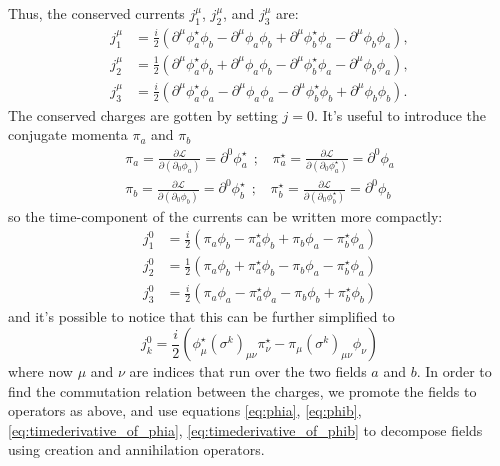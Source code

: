 Thus, the conserved currents \( j^\mu_1 \), \( j^\mu_2 \), and \( j^\mu_3 \)  are:
\[
\begin{aligned}
j^\mu_1 &= \frac{i}{2} \left( \partial^\mu \phi_a^\star \phi_b - \partial^\mu \phi_a \phi_b + \partial^\mu \phi_b^\star \phi_a - \partial^\mu \phi_b \phi_a \right), \\
j^\mu_2 &= \frac{1}{2} \left( \partial^\mu \phi_a^\star \phi_b + \partial^\mu \phi_a \phi_b - \partial^\mu \phi_b^\star \phi_a - \partial^\mu \phi_b \phi_a \right), \\
j^\mu_3 &= \frac{i}{2} \left( \partial^\mu \phi_a^\star \phi_a - \partial^\mu \phi_a \phi_a - \partial^\mu \phi_b^\star \phi_b + \partial^\mu \phi_b \phi_b \right).
\end{aligned}
\]
The conserved charges are gotten by setting $j=0$. It's useful to introduce the conjugate momenta $\pi_a$ and $\pi_b$
\begin{align*} \pi_a = \frac{\partial \mathcal L}{\partial(\partial_0 \phi_a)}= \partial^0 \phi_a^\star~~;~~~~
    \pi_a^\star = \frac{\partial \mathcal L}{\partial(\partial_0 \phi_a^\star)}= \partial^0 \phi_a  \\
       \pi_b =  \frac{\partial \mathcal L}{\partial(\partial_0 \phi_b)}= \partial^0 \phi_b^\star~~;~~~~
   \pi_b^\star =  \frac{\partial \mathcal L}{\partial(\partial_0 \phi_b^\star)}= \partial^0 \phi_b
\end{align*}
so the time-component of the currents can be written more compactly:
\begin{align*}
j^0_1 &= \frac{i}{2} \left( \pi_a \phi_b - \pi_a^\star \phi_b + \pi_b \phi_a - \pi_b^\star \phi_a \right)\\ 
j^0_2 &= \frac{1}{2} \left( \pi_a \phi_b + \pi_a^\star \phi_b - \pi_b \phi_a - \pi_b^\star \phi_a \right)\\
j^0_3 &= \frac{i}{2} \left( \pi_a \phi_a - \pi_a^\star \phi_a - \pi_b \phi_b + \pi_b^\star \phi_b \right)
\end{align*}
and it's possible to notice that this can be further simplified to 
\[
j_k^0 = \frac{i}{2} ( \phi^\star _\mu (\sigma^k)_{\mu\nu} \pi_\nu^\star - \pi_\mu(\sigma^k)_{\mu\nu}\phi_\nu )
\]
where now $\mu$ and $\nu$ are indices that run over the two fields $a$ and $b$.
In order to find the commutation relation between the charges, we promote the fields to operators as above, 
and use equations \eqref{eq:phia}, \eqref{eq:phib}, \eqref{eq:timederivative_of_phia}, \eqref{eq:timederivative_of_phib} to decompose fields using 
creation and annihilation operators.



